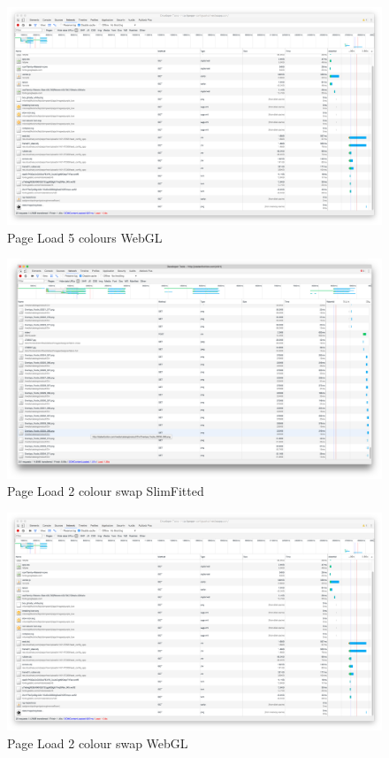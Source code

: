\begin{figure}
\includegraphics[width=15cm]{images/5differentColoursWebGL}
\caption{Page Load 5 colours WebGL}
\label{attachment:fiveColoursWebgl}
\end{figure}

\clearpage

\begin{figure}
\includegraphics[width=15cm]{images/2coloursSwap}
\caption{Page Load 2 colour swap SlimFitted}
\label{attachment:twoColourSwap}
\end{figure}

\begin{figure}
\includegraphics[width=15cm]{images/2ColoursSwapWebGL}
\caption{Page Load 2 colour swap WebGL}
\label{attachment:2ColoursSwapWebGL}
\end{figure}

